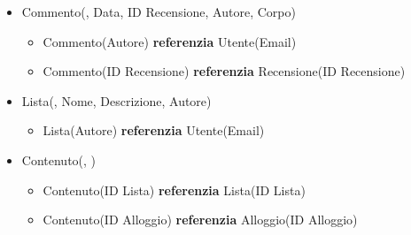 \begin{itemize}
      \item Commento(, Data, ID Recensione, Autore, Corpo)
            \begin{itemize}[noitemsep]
                  \item Commento(Autore) \textbf{referenzia} Utente(Email)
                  \item Commento(ID Recensione) \textbf{referenzia} Recensione(ID Recensione)
            \end{itemize}
      \item Lista(, Nome, Descrizione, Autore)
            \begin{itemize}[noitemsep]
                  \item Lista(Autore) \textbf{referenzia} Utente(Email)
            \end{itemize}
      \item Contenuto(, )
            \begin{itemize}[noitemsep]
                  \item Contenuto(ID Lista) \textbf{referenzia} Lista(ID Lista)
                  \item Contenuto(ID Alloggio) \textbf{referenzia} Alloggio(ID Alloggio)
            \end{itemize}
\end{itemize}